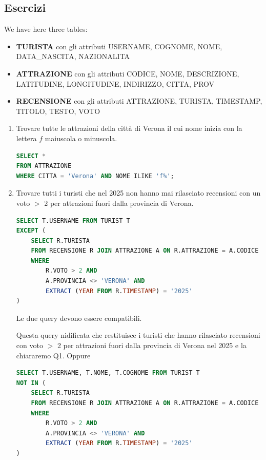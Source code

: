 \documentclass[a4paper]{article}
\begin{document}
\subsection{Esercizi}

\begin{Example}{}{}
We have here three tables:
\begin{itemize}
    \item \textbf{TURISTA} con gli attributi USERNAME, COGNOME, NOME, DATA\_NASCITA, NAZIONALITA
    \item \textbf{ATTRAZIONE} con gli attributi CODICE, NOME, DESCRIZIONE, LATITUDINE, LONGITUDINE, INDIRIZZO, CITTA, PROV
    \item \textbf{RECENSIONE} con gli attributi ATTRAZIONE, TURISTA, TIMESTAMP, TITOLO, TESTO, VOTO
\end{itemize}
\begin{enumerate}
    \item Trovare tutte le attrazioni della città di Verona il cui nome inizia con la lettera
    $f$ maiuscola o minuscola.
\begin{lstlisting}[language=SQL]
SELECT *
FROM ATTRAZIONE
WHERE CITTA = 'Verona' AND NOME ILIKE 'f%';
\end{lstlisting}
    \item Trovare tutti i turisti che nel 2025 non hanno mai rilasciato
    recensioni con un voto $>$ 2 per attrazioni fuori dalla provincia di Verona.
\begin{lstlisting}[language=SQL]
SELECT T.USERNAME FROM TURIST T
EXCEPT (
    SELECT R.TURISTA
    FROM RECENSIONE R JOIN ATTRAZIONE A ON R.ATTRAZIONE = A.CODICE
    WHERE
        R.VOTO > 2 AND
        A.PROVINCIA <> 'VERONA' AND
        EXTRACT (YEAR FROM R.TIMESTAMP) = '2025'
)
\end{lstlisting}
\noindent
\begin{Observation}{}{}
Le due query devono essere compatibili.
\end{Observation}{}{}
Questa query nidificata che restituisce i turisti che hanno rilasciato
recensioni con voto $>$ 2 per attrazioni fuori dalla provincia di Verona nel 2025 e la chiararemo Q1.
Oppure
\begin{lstlisting}[language=SQL]
SELECT T.USERNAME, T.NOME, T.COGNOME FROM TURIST T
NOT IN (
    SELECT R.TURISTA
    FROM RECENSIONE R JOIN ATTRAZIONE A ON R.ATTRAZIONE = A.CODICE
    WHERE
        R.VOTO > 2 AND
        A.PROVINCIA <> 'VERONA' AND
        EXTRACT (YEAR FROM R.TIMESTAMP) = '2025'
)
\end{lstlisting}

\end{enumerate}
\end{Example}
\end{document}
